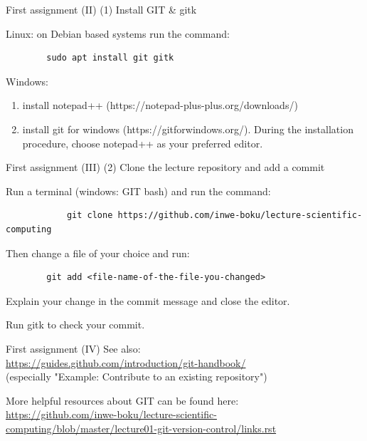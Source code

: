 \documentclass[10pt,color=usenames,dvipsnames]{beamer}
\begin{document}
\begin{frame}[fragile]{First assignment (II)}
	(1) Install GIT \& gitk

	Linux: on Debian based systems run the command:

	\begin{verbatim}
	    sudo apt install git gitk
	\end{verbatim}

    Windows:
    \begin{enumerate}
        \item install notepad++ (https://notepad-plus-plus.org/downloads/)
        \item install git for windows (https://gitforwindows.org/). During the installation procedure,
            choose notepad++ as your preferred editor.
    \end{enumerate}

\end{frame}

\begin{frame}[fragile]{First assignment (III)}
	(2) Clone the lecture repository and add a commit

	Run a terminal (windows: GIT bash) and run the command:

    {\footnotesize
        \begin{verbatim}
            git clone https://github.com/inwe-boku/lecture-scientific-computing
        \end{verbatim}
    }

	Then change a file of your choice and run:

	\begin{verbatim}
	    git add <file-name-of-the-file-you-changed>
	\end{verbatim}

	Explain your change in the commit message and close the editor.

	Run gitk to check your commit.

\end{frame}

\begin{frame}[fragile]{First assignment (IV)}
	See also:\\
	\href{https://guides.github.com/introduction/git-handbook/}{https://guides.github.com/introduction/git-handbook/}\\
	(especially "Example: Contribute to an existing repository")
    \bigskip

	More helpful resources about GIT can be found here:\\
	\href{https://github.com/inwe-boku/lecture-scientific-computing/blob/master/lecture01-git-version-control/links.rst}
	{https://github.com/inwe-boku/lecture-scientific-computing/blob/master/lecture01-git-version-control/links.rst}
\end{frame}
\end{document}
